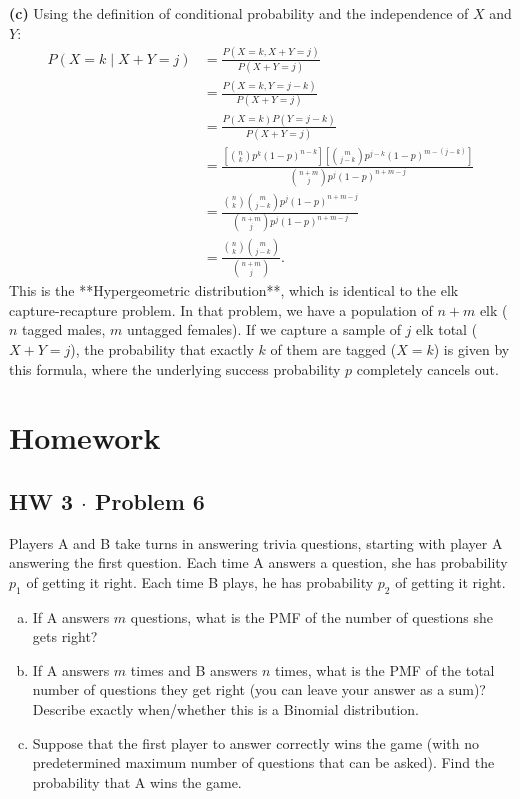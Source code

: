 \documentclass[11pt,a4paper]{article}
\begin{document}
\vspace{4pt}
\noindent \textbf{(c)} Using the definition of conditional probability and the independence of $X$ and $Y$:
\begin{align*}
P(X = k \mid X + Y = j) &= \frac{P(X = k, X + Y = j)}{P(X + Y = j)} \\
&= \frac{P(X = k, Y = j - k)}{P(X + Y = j)} \\
&= \frac{P(X = k) P(Y = j - k)}{P(X + Y = j)} \\
&= \frac{\left[ \binom{n}{k} p^k (1-p)^{n-k} \right] \left[ \binom{m}{j-k} p^{j-k} (1-p)^{m-(j-k)} \right]}{\binom{n+m}{j} p^j (1-p)^{n+m-j}} \\
&= \frac{\binom{n}{k} \binom{m}{j-k} p^j (1-p)^{n+m-j}}{\binom{n+m}{j} p^j (1-p)^{n+m-j}} \\
&= \frac{\binom{n}{k} \binom{m}{j-k}}{\binom{n+m}{j}}.
\end{align*}
This is the **Hypergeometric distribution**, which is identical to the elk capture-recapture problem. In that problem, we have a population of $n + m$ elk ($n$ tagged males, $m$ untagged females). If we capture a sample of $j$ elk total ($X + Y = j$), the probability that exactly $k$ of them are tagged ($X = k$) is given by this formula, where the underlying success probability $p$ completely cancels out.

\vspace{15pt}
\section{Homework}

\subsection{HW 3 $\cdot$ Problem 6}
\begin{tcolorbox}[title={HW 3 $\cdot$ Problem 6}]
Players A and B take turns in answering trivia questions, starting with player A answering the first question. Each time A answers a question, she has probability $p_1$ of getting it right. Each time B plays, he has probability $p_2$ of getting it right.
\begin{enumerate}[(a)]
\item If A answers $m$ questions, what is the PMF of the number of questions she gets right?
\item If A answers $m$ times and B answers $n$ times, what is the PMF of the total number of questions they get right (you can leave your answer as a sum)? Describe exactly when/whether this is a Binomial distribution.
\item Suppose that the first player to answer correctly wins the game (with no predetermined maximum number of questions that can be asked). Find the probability that A wins the game.
\end{enumerate}
\end{tcolorbox}
\end{document}
